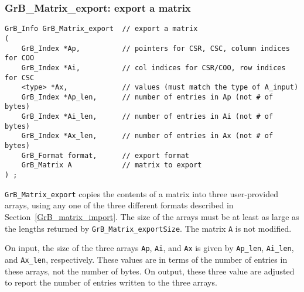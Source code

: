 \documentclass[12pt]{article}
\newenvironment{packed_itemize}{
\begin{itemize}
  \setlength{\itemsep}{1pt}
  \setlength{\parskip}{0pt}
  \setlength{\parsep}{0pt}
}{\end{itemize}}
\begin{document}
{\begin{packed_itemize}
%

\end{packed_itemize}

\subsubsection{{\sf GrB\_Matrix\_export:}  export a matrix}
\label{GrB_matrix_export}

\begin{mdframed}[userdefinedwidth=6in]
{\footnotesize
\begin{verbatim}
GrB_Info GrB_Matrix_export  // export a matrix
(
    GrB_Index *Ap,          // pointers for CSR, CSC, column indices for COO
    GrB_Index *Ai,          // col indices for CSR/COO, row indices for CSC
    <type> *Ax,             // values (must match the type of A_input)
    GrB_Index *Ap_len,      // number of entries in Ap (not # of bytes)
    GrB_Index *Ai_len,      // number of entries in Ai (not # of bytes)
    GrB_Index *Ax_len,      // number of entries in Ax (not # of bytes)
    GrB_Format format,      // export format
    GrB_Matrix A            // matrix to export
) ;
\end{verbatim}
} \end{mdframed}

\verb'GrB_Matrix_export' copies the contents of a matrix into three
user-provided arrays, using any one of the three different formats
described in Section~\ref{GrB_matrix_import}.  The size of the arrays must be
at least as large as the lengths returned by \verb'GrB_Matrix_exportSize'.  The
matrix \verb'A' is not modified.

On input, the size of the three arrays \verb'Ap', \verb'Ai', and \verb'Ax' is
given by \verb'Ap_len', \verb'Ai_len', and \verb'Ax_len', respectively.  These
values are in terms of the number of entries in these arrays, not the number of
bytes.  On output, these three value are adjusted to report the number of
entries written to the three arrays.

}
\end{document}
